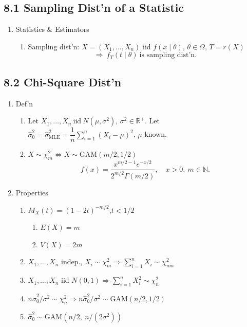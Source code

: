 \documentclass[11pt]{article}
\begin{document}
\subsection*{8.1 Sampling Dist'n of a Statistic}
\begin{enumerate}[label=\Roman*.]
  \item Statistics \& Estimators
  \begin{enumerate}[label=\Alph*.]
    \item Sampling dist'n: $X=(X_{1},\dots,X_{n})$ iid $f(x\mid\theta)$, $\theta\in\Omega$, $T=r(X)$
    \[
      \Rightarrow\ f_{T}(t\mid\theta)\ \text{is sampling dist'n}.
    \]
  \end{enumerate}
\end{enumerate}

\subsection*{8.2 Chi-Square Dist'n}
\begin{enumerate}[label=\Roman*.]
  \item Def'n
  \begin{enumerate}[label=\Alph*.]
    \item Let $X_{1},\dots,X_{n}\ \text{iid}\ N(\mu,\sigma^{2})$, $\sigma^{2}\in\mathbb{R}^{+}$.
    Let $\hat\sigma_{0}^{2}=\hat\sigma_{\text{MLE}}^{2}=\dfrac{1}{n}\sum_{i=1}^{n}(X_{i}-\mu)^{2}$, $\mu$ known.
    \item $X\sim\chi^{2}_{m}\iff X\sim\text{GAM}(m/2,1/2)$
    \[
      f(x)=\frac{x^{m/2-1}e^{-x/2}}{2^{m/2}\Gamma(m/2)},\quad x>0,\ m\in\mathbb{N}.
    \]
  \end{enumerate}
  \item Properties
  \begin{enumerate}[label=\Alph*.]
    \item $M_{X}(t)=(1-2t)^{-m/2}$,\quad $t<1/2$
    \begin{enumerate}[label=\arabic*.]
      \item $E(X)=m$
      \item $V(X)=2m$
    \end{enumerate}
    \item $X_{1},\dots,X_{n}$ indep., $X_{i}\sim\chi^{2}_{m}\Rightarrow \sum_{i=1}^{n}X_{i}\sim\chi^{2}_{nm}$
    \item $X_{1},\dots,X_{n}$ iid $N(0,1)\Rightarrow \sum_{i=1}^{n}X_{i}^{2}\sim\chi^{2}_{n}$
    \item $n\hat\sigma_{0}^{2}/\sigma^{2}\sim\chi^{2}_{n}\Rightarrow n\hat\sigma_{0}^{2}/\sigma^{2}\sim\text{GAM}(n/2,1/2)$
    \item $\hat\sigma_{0}^{2}\sim\text{GAM}\!\left(n/2,\ n/(2\sigma^{2})\right)$
  \end{enumerate}
\end{enumerate}
\end{document}
